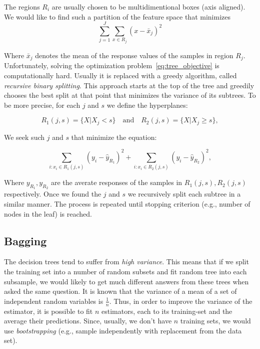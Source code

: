\documentclass{article}
\newcommand*\mean[1]{\bar{#1}}
\begin{document}
The regions $R_i$ are usually chosen to be multidimentional boxes (axis aligned).  We would like to find such a partition of the feature space that minimizes
\begin{equation}\label{eq:tree_objective}
\sum\limits_{j=1}^J\sum_{x\in R_j}{(x-\mean{x}_j)^2}
\end{equation}

Where $\mean{x}_j$ denotes the mean of the response values of the
samples in region $R_j$.  Unfortunately, solving the optimization
problem~\ref{eq:tree_objective} is computationally hard.  Usually it
is replaced with a greedy algorithm, called \textit{recursive binary
  splitting}.  This approach starts at the top of the tree and
greedily chooses the best split at that point that minimizes the
variance of its subtrees.  To be more precise, for each $j$ and $s$ we
define the hyperplanes:

\begin{equation}
  R_1(j,s) = \{ X\lvert X_j<s \}\quad\text{and}\quad R_2(j,s) = \{ X\lvert X_j \geq s \},
\end{equation}

We seek such $j$ and $s$ that minimize the equation:

\begin{equation}
  \sum\limits_{i:x_i\in R_1(j,s)}{(y_i-\hat{y}_{R_1})}^2 + \sum\limits_{i:x_i\in R_2(j,s)}{(y_i-\hat{y}_{R_2})}^2,
\end{equation}

Where $y_{R_1}, y_{R_2}$ are the averate responses of the samples in
$R_1(j,s), R_2(j,s)$ respectively.  Once we found the $j$ and $s$ we
recursively split each subtree in a similar manner.  The process is
repeated until stopping criterion (e.g., number of nodes in the leaf)
is reached.

\subsection{Bagging}
The decision trees tend to suffer from \textit{high variance}. This
means that if we split the training set into a number of random
subsets and fit random tree into each subsample, we would likely to
get much different answers from these trees when asked the same
question.  It is known that the variance of a mean of a set of
independent random variables is $\frac{1}{n}$.  Thus, in order to
improve the variance of the estimator, it is possible to fit $n$
estimators, each to its training-set and the average their
predictions.  Since, usually, we don't have $n$ training sets, we
would use \textit{bootstrapping} (e.g., sample independently with
replacement from the data set).
\end{document}

